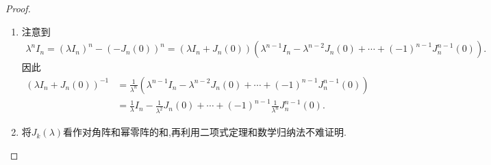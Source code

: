 \documentclass[../../main.tex]{subfiles}%
\begin{document}
\begin{proof}
\begin{enumerate}[(1)]
\item 注意到
\begin{align*}
\lambda ^nI_n=\left( \lambda I_n \right) ^n-\left( -J_n\left( 0 \right) \right) ^n=\left( \lambda I_n+J_n\left( 0 \right) \right) \left( \lambda ^{n-1}I_n-\lambda ^{n-2}J_n\left( 0 \right) +\cdots +\left( -1 \right) ^{n-1}J_{n}^{n-1}\left( 0 \right) \right) .
\end{align*}
因此
\begin{align*}
\left( \lambda I_n+J_n\left( 0 \right) \right) ^{-1}&=\frac{1}{\lambda ^n}\left( \lambda ^{n-1}I_n-\lambda ^{n-2}J_n\left( 0 \right) +\cdots +\left( -1 \right) ^{n-1}J_{n}^{n-1}\left( 0 \right) \right) 
\\
&=\frac{1}{\lambda}I_n-\frac{1}{\lambda ^2}J_n\left( 0 \right) +\cdots +\left( -1 \right) ^{n-1}\frac{1}{\lambda ^n}J_{n}^{n-1}\left( 0 \right) .
\end{align*}

\item 将$J_k(\lambda)$看作对角阵和幂零阵的和,再利用二项式定理和数学归纳法不难证明.


\end{enumerate}
\end{proof}
\end{document}
